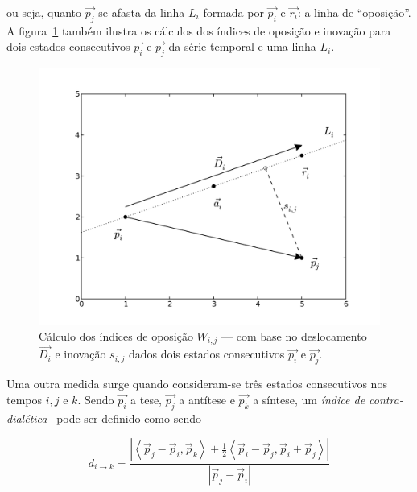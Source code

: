 \noindent ou seja, quanto $\vec{p_j}$ se afasta da linha $L_i$ formada por $\vec{p_i}$ e
$\vec{r_i}$: a linha de ``oposição''.  A figura~\ref{fig:desc_opos_inov} também
ilustra os cálculos dos índices de oposição e inovação para dois estados
consecutivos $\vec{p_i}$ e $\vec{p_j}$ da série temporal e uma linha $L_i$.

\begin{figure}[ht!]
\begin{center}
              \caption{Cálculo dos índices de oposição $W_{i,j}$ --- com base
        no deslocamento $\vec{D_i}$ e inovação $s_{i,j}$ dados dois
        estados consecutivos $\vec{p_i}$ e $\vec{p_j}$.}
        \label{fig:desc_opos_inov}
        \includegraphics[scale=.6]{figs/desc_opos.pdf}
        \fonteminha
\end{center}
\end{figure}

Uma outra medida surge quando consideram-se três estados consecutivos
nos tempos $i,j$ e $k$. Sendo $\vec{p_i}$ a tese, $\vec{p_j}$ a
antítese e $\vec{p_k}$ a síntese, um \emph{índice de
  contra-dialética}~\cite{vieira} pode ser definido como sendo


\begin{equation}
d_{i \rightarrow k} = 
      \frac{|\left< \vec{p}_j-\vec{p}_i,\vec{p}_k \right> + 
        \frac{1}{2}\left<\vec{p}_i-\vec{p}_j, \vec{p}_i+\vec{p}_j\right>|}
           {|\vec{p}_j-\vec{p}_i|}
\end{equation}

